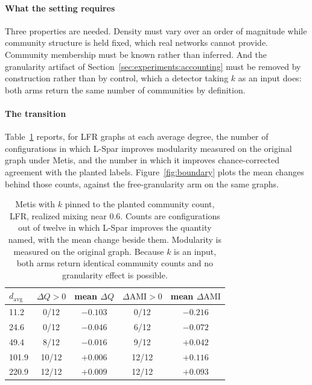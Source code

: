 \paragraph{What the setting requires}
Three properties are needed. Density must vary over an order of magnitude while
community structure is held fixed, which real networks cannot provide. Community
membership must be known rather than inferred. And the granularity artifact of
Section~\ref{sec:experiments:accounting} must be removed by construction rather
than by control, which a detector taking $k$ as an input does: both arms return
the same number of communities by definition.

\paragraph{The transition}
Table~\ref{tab:boundary} reports, for LFR graphs at each average degree, the
number of configurations in which L-Spar improves modularity measured on the
original graph under Metis, and the number in which it improves chance-corrected
agreement with the planted labels. Figure~\ref{fig:boundary} plots the mean
changes behind those counts, against the free-granularity arm on the same graphs.



\begin{table}[t]
\centering
\caption{Metis with $k$ pinned to the planted community count, LFR, realized
mixing near $0.6$. Counts are configurations out of twelve in which L-Spar
improves the quantity named, with the mean change beside them. Modularity is
measured on the original graph. Because $k$ is an input, both arms return
identical community counts and no granularity effect is possible.}
\label{tab:boundary}
\small
\setlength{\tabcolsep}{5pt}
\begin{tabular}{@{}lcccc@{}}
\toprule
$d_{\mathrm{avg}}$ & $\Delta Q > 0$ & mean $\Delta Q$ &
$\Delta\mathrm{AMI} > 0$ & mean $\Delta\mathrm{AMI}$\\
\midrule
11.2  & 0/12  & $-0.103$ & 0/12  & $-0.216$\\
24.6  & 0/12  & $-0.046$ & 6/12  & $-0.072$\\
49.4  & 8/12  & $-0.016$ & 9/12  & $+0.042$\\
101.9 & 10/12 & $+0.006$ & 12/12 & $+0.116$\\
220.9 & 12/12 & $+0.009$ & 12/12 & $+0.093$\\
\bottomrule
\end{tabular}
\end{table}

